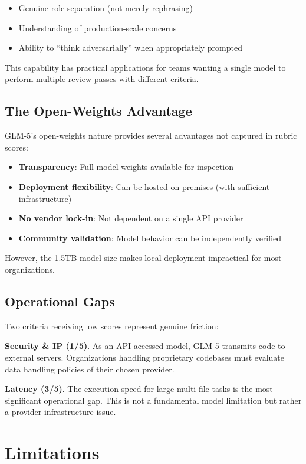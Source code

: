 \documentclass[conference]{IEEEtran}
\begin{document}
\begin{itemize}
    \item Genuine role separation (not merely rephrasing)
    \item Understanding of production-scale concerns
    \item Ability to ``think adversarially'' when appropriately prompted
\end{itemize}

This capability has practical applications for teams wanting a single model to perform multiple review passes with different criteria.

\subsection{The Open-Weights Advantage}
GLM-5's open-weights nature provides several advantages not captured in rubric scores:

\begin{itemize}
    \item \textbf{Transparency}: Full model weights available for inspection
    \item \textbf{Deployment flexibility}: Can be hosted on-premises (with sufficient infrastructure)
    \item \textbf{No vendor lock-in}: Not dependent on a single API provider
    \item \textbf{Community validation}: Model behavior can be independently verified
\end{itemize}

However, the 1.5TB model size makes local deployment impractical for most organizations.

\subsection{Operational Gaps}
Two criteria receiving low scores represent genuine friction:

\textbf{Security \& IP (1/5)}. As an API-accessed model, GLM-5 transmits code to external servers. Organizations handling proprietary codebases must evaluate data handling policies of their chosen provider.

\textbf{Latency (3/5)}. The execution speed for large multi-file tasks is the most significant operational gap. This is not a fundamental model limitation but rather a provider infrastructure issue.

\section{Limitations}
\end{document}
